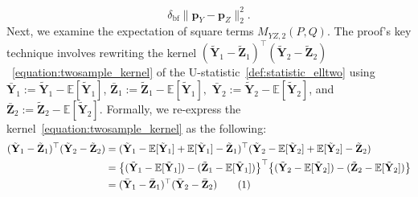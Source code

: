 \documentclass[twoside,11pt]{article}
\newcommand\numberthis{\addtocounter{equation}{1}\tag{\theequation}}
\newcommand{\rvTwo}{Y}
\newcommand{\rvThree}{Z}
\newcommand{\vectorize}[1]{\mathbf{#1}}
\newcommand{\mE}{\mathbb{E}} %
\newcommand{\probVec}{\mathbf{p}} %
\newcommand{\kernelMoment}{M} %
\newcommand{\dataGenDist}{P}  %
\newcommand{\privacyMechanism}{Q}
\newcommand{\smallNumber}{\delta}
\newcommand{\smallNumberrappor}{\smallNumber_{\mathrm{bf}}}
\newcommand{\momentTwosampleExpSquare}{\kernelMoment_{\rvTwo \rvThree,2}(\dataGenDist, \privacyMechanism)}
\begin{document}
\begin{appendix}
\begin{itemize}
\begin{equation}
		\smallNumberrappor
		\|\probVec_{\rvTwo} - \probVec_{\rvThree}\|_2^2.
	\end{equation}
	Next, we examine the expectation of square terms \(\momentTwosampleExpSquare\). The proof's key technique involves rewriting the kernel 
	$
	(\tilde{\vectorize{\rvTwo}}_{1} - \tilde{\vectorize{\rvThree}}_{1})^\top (\tilde{\vectorize{\rvTwo}}_{2} - \tilde{\vectorize{\rvThree}}_{2})
	$~\eqref{equation:twosample_kernel}
	of the U-statistic~\eqref{def:statistic_elltwo} using
	$\bar{\vectorize{\rvTwo}}_{1}
	:=
	\tilde{\vectorize{\rvTwo}}_{1}
	-
	\mE [\tilde{\vectorize{Y}}_1]$,
	$
	\bar{\vectorize{\rvThree}}_{1}
	:=
	\tilde{\vectorize{\rvThree}}_{1}
	-
	\mE [\tilde{\vectorize{\rvTwo}}_1],
	$
	$\bar{\vectorize{\rvTwo}}_{2}
	:=
	\tilde{\vectorize{\rvTwo}}_{2}
	-
	\mE [\tilde{\vectorize{Y}}_2]$, and
	$
	\bar{\vectorize{\rvThree}}_{2}
	:=
	\tilde{\vectorize{\rvThree}}_{2}
	-
	\mE [\tilde{\vectorize{\rvTwo}}_2].
	$
	Formally, 
	we re-express the kernel~\eqref{equation:twosample_kernel} as the following:
	\begin{align*}
		(\tilde{\vectorize{\rvTwo}}_{1} - \tilde{\vectorize{\rvThree}}_{1})^\top (\tilde{\vectorize{\rvTwo}}_{2} - \tilde{\vectorize{\rvThree}}_{2})
		&=
		(\tilde{\vectorize{\rvTwo}}_{1}
		-
		\mE [\tilde{\vectorize{Y}}_1]
		+
		\mE [\tilde{\vectorize{Y}}_1]
		-
		\tilde{\vectorize{\rvThree}}_{1})^\top (
		\tilde{\vectorize{\rvTwo}}_{2} 
		-
		\mE [\tilde{\vectorize{Y}}_2]
		+
		\mE [\tilde{\vectorize{Y}}_2]
		-
		\tilde{\vectorize{\rvThree}}_{2})
		\\&=
		\bigl\{
		(
		\tilde{\vectorize{\rvTwo}}_{1}
		-
		\mE [\tilde{\vectorize{Y}}_1]
		)
		-
		(
		\tilde{\vectorize{\rvThree}}_{1}
		-
		\mE [\tilde{\vectorize{Y}}_1]
		)
		\bigr\}^\top \bigl\{
		(
		\tilde{\vectorize{\rvTwo}}_{2}
		-
		\mE [\tilde{\vectorize{Y}}_2]
		)
		-
		(
		\tilde{\vectorize{\rvThree}}_{2}
		-
		\mE [\tilde{\vectorize{Y}}_2]
		)
		\bigr\}
		\\&=
		(\bar{\vectorize{\rvTwo}}_{1} - \bar{\vectorize{\rvThree}}_{1})^\top (\bar{\vectorize{\rvTwo}}_{2} - \bar{\vectorize{\rvThree}}_{2})
		\numberthis
		\label{statistic:rappor_elltwo_kernel_debiased}
	\end{align*}

\end{itemize}
\end{appendix}
\end{document}
